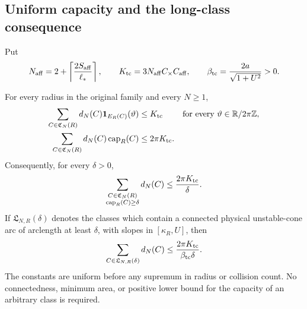 \subsection{Uniform capacity and the long-class consequence}

Put
\begin{equation}\label{tc:global-constants}
 N_{\rm aff}=2+\left\lceil {2S_{\rm aff}\over\ell_*}\right\rceil,
 \qquad K_{\rm tc}=3N_{\rm aff}C_\times C_{\rm aff},\qquad
 \beta_{\rm tc}={2a\over\sqrt{1+U^2}}>0.
\end{equation}

\begin{theorem}
\label{tc:all-classes}
For every radius in the original family and every $N\ge1$,
\begin{align}
 \sum_{C\in\mathfrak C_N(R)}
       d_N(C)\boldsymbol 1_{E_R(C)}(\vartheta)
       &\le K_{\rm tc}
       &&\text{for every }\vartheta\in\mathbb R/2\pi\mathbb Z,
                                                    \label{tc:fiber-bound}\\
 \sum_{C\in\mathfrak C_N(R)}
       d_N(C)\operatorname{cap}_R(C)
       &\le2\pi K_{\rm tc}.                         \label{tc:capacity-bound}
\end{align}
Consequently, for every $\delta>0$,
\begin{equation}\label{tc:positive-capacity}
 \sum_{\substack{C\in\mathfrak C_N(R)\\
                 \operatorname{cap}_R(C)\ge\delta}}d_N(C)
                      \le{2\pi K_{\rm tc}\over\delta}.
\end{equation}
If $\mathfrak L_{N,R}(\delta)$ denotes the classes which contain
a connected physical unstable-cone arc of arclength at least
$\delta$, with slopes in $[\kappa_R,U]$, then
\begin{equation}\label{tc:long-class-bound}
 \sum_{C\in\mathfrak L_{N,R}(\delta)}d_N(C)
                      \le{2\pi K_{\rm tc}\over\beta_{\rm tc}\delta}.
\end{equation}
The constants are uniform before any supremum in radius or collision
count.  No connectedness, minimum area, or positive lower bound for
the capacity of an arbitrary class is required.
\end{theorem}

